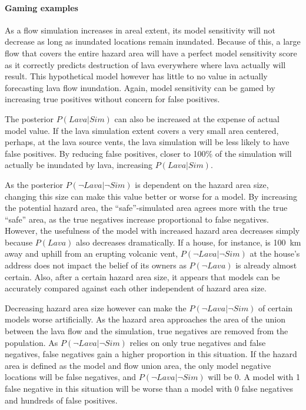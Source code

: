 \documentclass[12pt,letter]{article}
\begin{document}
\paragraph{Gaming examples}
As a flow simulation increases in areal extent, its model sensitivity will not decrease as long as inundated locations remain inundated. Because of this, a large flow that covers the entire hazard area will have a perfect model sensitivity score as it correctly predicts destruction of lava everywhere where lava actually will result. This hypothetical model however has little to no value in actually forecasting lava flow inundation. Again, model sensitivity can be gamed by increasing true positives without concern for false positives. 

The posterior $P(Lava|Sim)$ can also be increased at the expense of actual model value. If the lava simulation extent covers a very small area centered, perhaps, at the lava source vents, the lava simulation will be less likely to have false positives. By reducing false positives, closer to 100\% of the simulation will actually be inundated by lava, increasing $P(Lava|Sim)$.

As the posterior $P(\neg Lava|\neg Sim)$ is dependent on the hazard area size, changing this size can make this value better or worse for a model. By increasing the potential hazard area, the ``safe''-simulated area agrees more with the true ``safe'' area, as the true negatives increase proportional to false negatives. However, the usefulness of the model with increased hazard area decreases simply because $P(Lava)$ also decreases dramatically. If a house, for instance, is 100~km away and uphill from an erupting volcanic vent, $P(\neg Lava|\neg Sim)$ at the house's address does not impact the belief of its owners as $P(\neg Lava)$ is already almost certain. Also, after a certain hazard area size, it appears that models can be accurately compared against each other independent of hazard area size.

Decreasing hazard area size however can make the  $P(\neg Lava|\neg Sim)$ of certain models worse artificially. As the hazard area approaches the area of the union between the lava flow and the simulation, true negatives are removed from the population. As $P(\neg Lava|\neg Sim)$ relies on only true negatives and false negatives, false negatives gain a higher proportion in this situation. If the hazard area is defined as the model and flow union area, the only model negative locations will be false negatives, and $P(\neg Lava|\neg Sim)$ will be 0. A model with 1 false negative in this situation will be worse than a model with 0 false negatives and hundreds of false positives.
\end{document}
